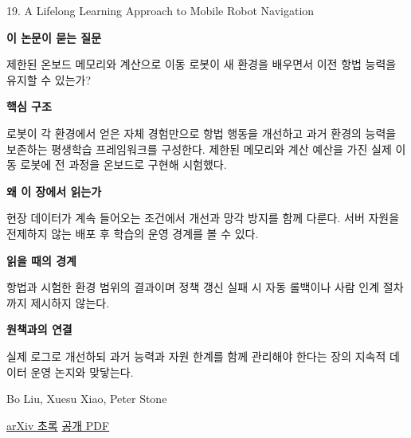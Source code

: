 \documentclass[11pt,openany]{book}
\begin{document}
\begin{termcard}{19. A Lifelong Learning Approach to Mobile Robot Navigation}

\par

\medskip

{\sffamily\bfseries\color{deepblue} 이 논문이 묻는 질문}\par

제한된 온보드 메모리와 계산으로 이동 로봇이 새 환경을 배우면서 이전 항법 능력을 유지할 수 있는가?

\smallskip

{\sffamily\bfseries\color{deepblue} 핵심 구조}\par

로봇이 각 환경에서 얻은 자체 경험만으로 항법 행동을 개선하고 과거 환경의 능력을 보존하는 평생학습 프레임워크를 구성한다. 제한된 메모리와 계산 예산을 가진 실제 이동 로봇에 전 과정을 온보드로 구현해 시험했다.

\smallskip

{\sffamily\bfseries\color{deepblue} 왜 이 장에서 읽는가}\par

현장 데이터가 계속 들어오는 조건에서 개선과 망각 방지를 함께 다룬다. 서버 자원을 전제하지 않는 배포 후 학습의 운영 경계를 볼 수 있다.

\smallskip

{\sffamily\bfseries\color{coral} 읽을 때의 경계}\par

항법과 시험한 환경 범위의 결과이며 정책 갱신 실패 시 자동 롤백이나 사람 인계 절차까지 제시하지 않는다.

\smallskip

{\sffamily\bfseries\color{teal} 원책과의 연결}\par

실제 로그로 개선하되 과거 능력과 자원 한계를 함께 관리해야 한다는 장의 지속적 데이터 운영 논지와 맞닿는다.

\medskip

{\footnotesize\color{muted} Bo Liu, Xuesu Xiao, Peter Stone\par

\href{https://arxiv.org/abs/2007.14486}{arXiv 초록} \quad \href{https://arxiv.org/pdf/2007.14486}{공개 PDF}\par}

\end{termcard}
\end{document}
